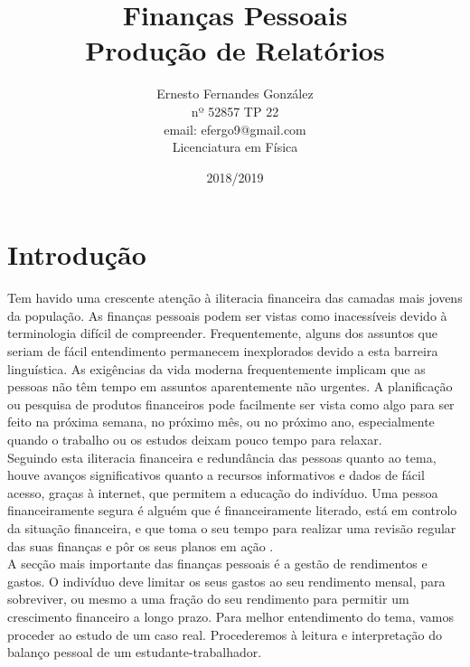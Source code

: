 \documentclass[11pt]{report}
\begin{document}
\title{Finanças Pessoais\\
Produção de Relatórios}
\author{Ernesto Fernandes González\\
nº 52857 \quad TP 22 \\
email: efergo9@gmail.com\\
Licenciatura em Física}
\date{2018/2019}
\maketitle
\tableofcontents

\chapter{Introdução}
Tem havido uma crescente atenção à iliteracia financeira das camadas mais jovens da população. As finanças pessoais podem ser vistas como inacessíveis devido à terminologia difícil de compreender. Frequentemente, alguns dos assuntos que seriam de fácil entendimento permanecem inexplorados devido a esta barreira linguística.
As exigências da vida moderna frequentemente implicam que as pessoas não têm tempo em assuntos aparentemente não urgentes. A planificação ou pesquisa de produtos financeiros pode facilmente ser vista como algo para ser feito na próxima semana, no próximo mês, ou no próximo ano, especialmente quando o trabalho ou os estudos deixam pouco tempo para relaxar.\\
Seguindo esta iliteracia financeira e redundância das pessoas quanto ao tema, houve avanços significativos quanto a recursos informativos e dados de fácil acesso, graças à internet, que permitem a educação do indivíduo.
Uma pessoa financeiramente segura é alguém que é financeiramente literado, está em controlo da situação financeira, e que toma o seu tempo para realizar  uma revisão regular das suas finanças e pôr os seus planos em ação \cite{king}.\\
A secção mais importante das finanças pessoais é a gestão de rendimentos e gastos. O indivíduo deve limitar os seus gastos ao seu rendimento mensal, para sobreviver, ou mesmo a uma fração do seu rendimento para permitir um crescimento financeiro a longo prazo.
Para melhor entendimento do tema, vamos proceder ao estudo de um caso real. Procederemos à leitura e interpretação do balanço pessoal de um estudante-trabalhador.
\end{document}
